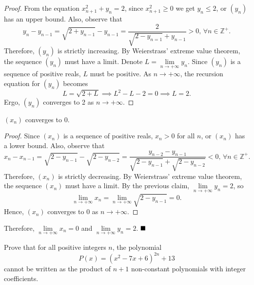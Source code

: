 \documentclass[11pt]{article}
\newenvironment{solution}[1][Solution]{%
  \proof[\normalfont \faPenNib \hspace{0.2cm} \ttfamily \scshape \large #1]%
}{\(\hfill \blacksquare\){\parfillskip0pt\par}}
\theoremstyle{definition}
\begin{document}
\begin{solution}
            \begin{proof}
                From the equation \(x_{n+1}^2 + y_n = 2\), since \(x_{n+1}^2 \geq 0\) we get \(y_n \leq 2\), or \((y_n)\) has an upper bound. Also, observe that
                \[y_n - y_{n-1} = \sqrt{2 + y_{n-1}} - y_{n-1} = \frac{2}{\sqrt{2 - y_{n=1}} + y_{n-1}} > 0 \text{, } \forall n \in \mathbb{Z}^+.\]
                Therefore, \((y_n)\) is strictly increasing. By Weierstrass' extreme value theorem, the sequence \((y_n)\) must have a limit. Denote \(L = \lim\limits_{n \to +\infty} y_n\). Since \((y_n)\) is a sequence of positive reals, \(L\) must be positive. As \(n \to +\infty\), the recursion equation for \((y_n)\) becomes
                \[L = \sqrt{2 + L} \implies L^2 - L - 2 = 0 \implies L = 2.\]
                Ergo, \((y_n)\) converges to 2 as \(n \to +\infty\).
            \end{proof}

            \begin{claim}
                \((x_n)\) converges to 0.
            \end{claim}

            \begin{proof}
                Since \((x_n)\) is a sequence of positive reals, \(x_n > 0\) for all \(n\), or \((x_n)\) has a lower bound. Also, observe that
                \[x_n - x_{n-1} = \sqrt{2 - y_{n-1}} - \sqrt{2 - y_{n-2}} = \frac{y_{n-2} - y_{n-1}}{\sqrt{2 - y_{n-1}} + \sqrt{2 - y_{n-2}}} < 0 \text{, } \forall n \in \mathbb{Z}^+.\]
                Therefore, \((x_n)\) is strictly decreasing. By Weierstrass' extreme value theorem, the sequence \((x_n)\) must have a limit. By the previous claim, \(\lim\limits_{n \to +\infty} y_n = 2\), so
                \[\lim\limits_{n \to +\infty} x_n = \lim\limits_{n \to +\infty} \sqrt{2 - y_{n-1}} = 0.\]
                Hence, \((x_n)\) converges to 0 as \(n \to +\infty\).
            \end{proof}

            Therefore, \(\lim\limits_{n \to +\infty} x_n = 0\) and \(\lim\limits_{n \to +\infty} y_n = 2\).
        \end{solution}

        \newpage

        \begin{problem}
            Prove that for all positive integers \(n\), the polynomial
            \[P(x) = (x^2 - 7x + 6)^{2n} + 13\]
            cannot be written as the product of \(n + 1\) non-constant polynomials with integer coefficients.
        \end{problem}
\end{document}
